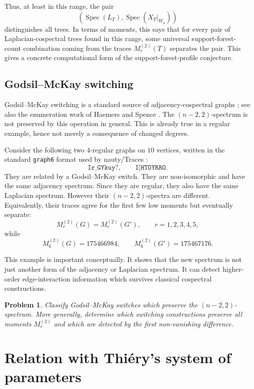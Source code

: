 \documentclass{amsart}
\newtheorem{problem}{Problem}
\theoremstyle{definition}
\newcommand{\Spec}{\operatorname{Spec}}
\begin{document}
Thus, at least in this range, the pair
\[
\left(\Spec(L_T),\Spec(X_T|_{W_n})\right)
\]
distinguishes all trees.  In terms of moments, this says that for every pair
of Laplacian-cospectral trees found in this range, some universal support-forest-count
combination coming from the traces $M_r^{(2)}(T)$ separates the pair.
This gives a concrete computational form of the support-forest-profile conjecture.

\subsection{Godsil--McKay switching}

Godsil--McKay switching is a standard source of adjacency-cospectral graphs \cite{GodsilMcKay}; see also the enumeration work of Haemers and Spence \cite{HaemersSpence}.
The $(n-2,2)$-spectrum is not preserved by this operation in general.
This is already true in a regular example, hence not merely a consequence of
changed degrees.

Consider the following two $4$-regular graphs on $10$ vertices, written in
the standard \texttt{graph6} format used by nauty/Traces \cite{McKayPiperno}:
\[
\texttt{Ir\_GYkuy?},\qquad \texttt{I]HTOYRRO}.
\]
They are related by a Godsil--McKay switch.  They are non-isomorphic and have
the same adjacency spectrum.  Since they are regular, they also have the same
Laplacian spectrum.  However their $(n-2,2)$-spectra are different.  Equivalently,
their traces agree for the first few low moments but eventually separate:
\[
M_r^{(2)}(G)=M_r^{(2)}(G'),\qquad r=1,2,3,4,5,
\]
while
\[
M_6^{(2)}(G)=175466984,
\qquad
M_6^{(2)}(G')=175467176.
\]

This example is important conceptually.  It shows that the new spectrum is not
just another form of the adjacency or Laplacian spectrum.  It can detect
higher-order edge-interaction information which survives classical cospectral
constructions.

\begin{problem}
Classify Godsil--McKay switches which preserve the $(n-2,2)$-spectrum.  More
generally, determine which switching constructions preserve all moments
$M_r^{(2)}$ and which are detected by the first non-vanishing difference.
\end{problem}

\section{Relation with Thi\'ery's system of parameters}
\end{document}
